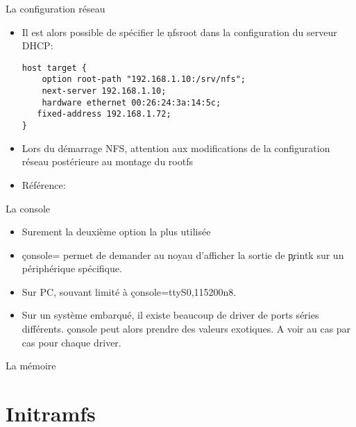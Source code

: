 \begin{frame}[fragile=singleslide]{La configuration réseau}
  \begin{itemize} 
  \item  Il est  alors possible  de spécifier  le \c{nfsroot}  dans la
    configuration du serveur DHCP:
     \begin{lstlisting} 
host target {
    option root-path "192.168.1.10:/srv/nfs";
    next-server 192.168.1.10;
    hardware ethernet 00:26:24:3a:14:5c;
   fixed-address 192.168.1.72;
}
     \end{lstlisting} 
   \item  Lors du  démarrage NFS,  attention aux  modifications  de la
     configuration réseau postérieure au montage du rootfs
    \item Référence: 
  \end{itemize} 
\end{frame} 

\begin{frame}[fragile=singleslide]{La console}
  \begin{itemize} 
    \item Surement la deuxième option la plus utilisée
    \item  \c{console=}  permet de  demander  au  noyau d'afficher  la
      sortie de \c{printk} sur un périphérique spécifique.
    \item Sur PC, souvant limité à \c{console=ttyS0,115200n8}.
    \item Sur  un système  embarqué, il existe  beaucoup de  driver de
      ports  séries différents.   \c{console} peut  alors  prendre des
      valeurs exotiques. A voir au cas par cas pour chaque driver.
  \end{itemize} 
\end{frame} 

\begin{frame}[fragile=singleslide]{La mémoire}
\end{frame} 

\section{Initramfs}

